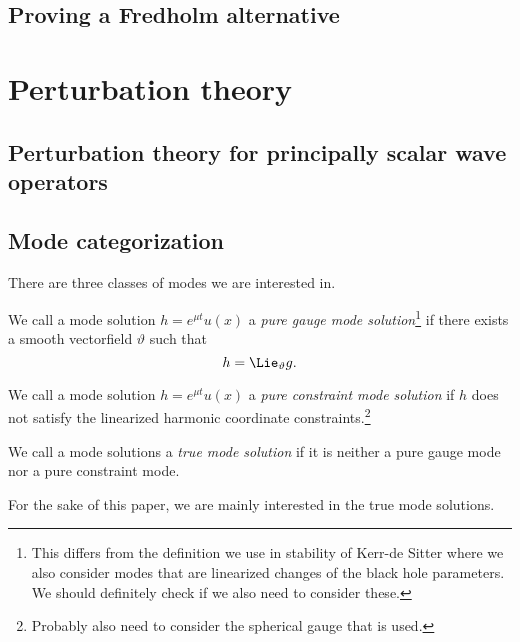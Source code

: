 \documentclass{article}
\begin{document}
\subsection{Proving a Fredholm alternative}

\section{Perturbation theory}

\subsection{Perturbation theory for principally scalar wave operators}

\subsection{Mode categorization}

There are three classes of modes we are interested in.
\begin{definition}
  We call a mode solution $h = e^{\mu t}u(x)$ a \emph{pure gauge mode
    solution}\footnote{This differs from the definition we use in
    stability of Kerr-de Sitter where we also consider modes that are
    linearized changes of the black hole parameters. We should
    definitely check if we also need to consider these.} if there exists a smooth vectorfield
  $\vartheta$ such that
  \begin{equation*}
    h = \Lie_{\vartheta}g.
  \end{equation*}
\end{definition}

\begin{definition}
  We call a mode solution $h = e^{\mu t}u(x)$ a \emph{pure constraint
    mode solution} if $h$ does not satisfy the linearized harmonic
  coordinate constraints.\footnote{Probably also need to consider the
    spherical gauge that is used.}
\end{definition}

\begin{definition}
  We call a mode solutions a \emph{true mode solution} if it is
  neither a pure gauge mode nor a pure constraint mode. 
\end{definition}

For the sake of this paper, we are mainly interested in the true mode solutions. 
\end{document}
